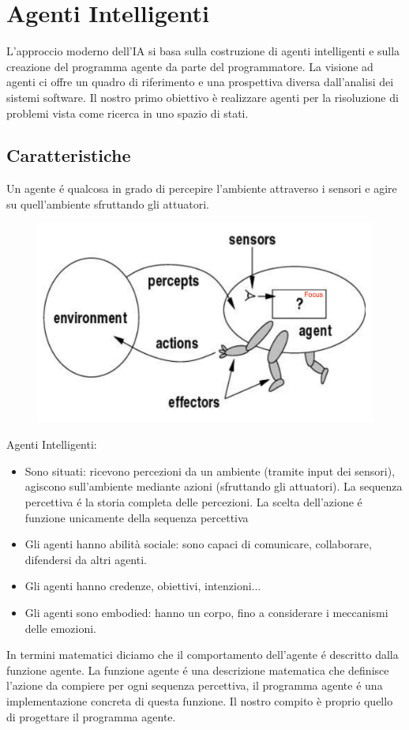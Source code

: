 \documentclass{article}
\begin{document}
\section{Agenti Intelligenti}
L'approccio moderno dell'IA si basa sulla costruzione di agenti intelligenti e sulla creazione del programma agente da parte del programmatore. La visione ad agenti ci offre un quadro di riferimento e una prospettiva diversa dall'analisi dei sistemi software. Il nostro primo obiettivo è realizzare agenti per la risoluzione di problemi vista come ricerca in uno spazio di stati.

\subsection{Caratteristiche}
Un agente é qualcosa in grado di percepire l'ambiente attraverso i sensori e agire su quell'ambiente sfruttando gli attuatori.
\begin{figure}[H]
    \centering
    \includegraphics[scale=0.25]{Images/AgentiAIMA.png}
\end{figure}
Agenti Intelligenti: 
\begin{itemize}
    \item Sono situati: ricevono percezioni da un ambiente (tramite input dei sensori), agiscono sull'ambiente mediante azioni (sfruttando gli attuatori). La sequenza percettiva é la storia completa delle percezioni. La scelta dell'azione é funzione unicamente della sequenza percettiva
    \item Gli agenti hanno abilità sociale: sono capaci di comunicare, collaborare, difendersi da altri agenti.
    \item Gli agenti hanno credenze, obiettivi, intenzioni...
    \item Gli agenti sono embodied: hanno un corpo, fino a considerare i meccanismi delle emozioni.
\end{itemize}
In termini matematici diciamo che il comportamento dell'agente é descritto dalla funzione agente. La funzione agente é una descrizione matematica che definisce l’azione da compiere per ogni sequenza percettiva, il programma agente é una implementazione concreta di questa funzione. Il nostro compito è proprio quello di progettare il programma agente.
\end{document}
